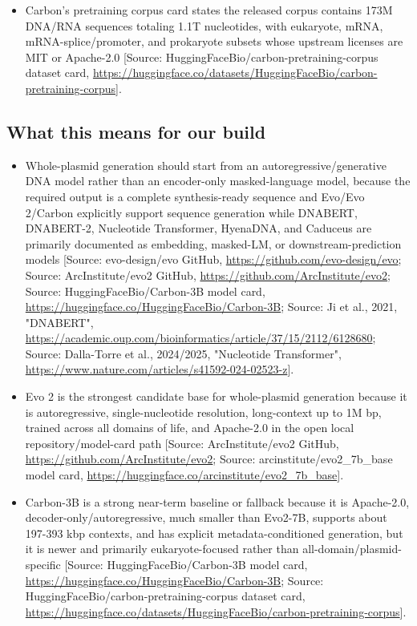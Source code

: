 \documentclass[11pt]{report}
\begin{document}
\begin{itemize}
\item Carbon's pretraining corpus card states the released corpus contains 173M DNA/RNA sequences totaling 1.1T nucleotides, with eukaryote, mRNA, mRNA-splice/promoter, and prokaryote subsets whose upstream licenses are MIT or Apache-2.0 [Source: HuggingFaceBio/carbon-pretraining-corpus dataset card, \url{https://huggingface.co/datasets/HuggingFaceBio/carbon-pretraining-corpus}].
\end{itemize}

\subsection{What this means for our build}
\begin{itemize}
\item Whole-plasmid generation should start from an autoregressive/generative DNA model rather than an encoder-only masked-language model, because the required output is a complete synthesis-ready sequence and Evo/Evo 2/Carbon explicitly support sequence generation while DNABERT, DNABERT-2, Nucleotide Transformer, HyenaDNA, and Caduceus are primarily documented as embedding, masked-LM, or downstream-prediction models [Source: evo-design/evo GitHub, \url{https://github.com/evo-design/evo}; Source: ArcInstitute/evo2 GitHub, \url{https://github.com/ArcInstitute/evo2}; Source: HuggingFaceBio/Carbon-3B model card, \url{https://huggingface.co/HuggingFaceBio/Carbon-3B}; Source: Ji et al., 2021, "DNABERT", \url{https://academic.oup.com/bioinformatics/article/37/15/2112/6128680}; Source: Dalla-Torre et al., 2024/2025, "Nucleotide Transformer", \url{https://www.nature.com/articles/s41592-024-02523-z}].
\item Evo 2 is the strongest candidate base for whole-plasmid generation because it is autoregressive, single-nucleotide resolution, long-context up to 1M bp, trained across all domains of life, and Apache-2.0 in the open local repository/model-card path [Source: ArcInstitute/evo2 GitHub, \url{https://github.com/ArcInstitute/evo2}; Source: arcinstitute/evo2\_7b\_base model card, \url{https://huggingface.co/arcinstitute/evo2_7b_base}].
\item Carbon-3B is a strong near-term baseline or fallback because it is Apache-2.0, decoder-only/autoregressive, much smaller than Evo2-7B, supports about 197-393 kbp contexts, and has explicit metadata-conditioned generation, but it is newer and primarily eukaryote-focused rather than all-domain/plasmid-specific [Source: HuggingFaceBio/Carbon-3B model card, \url{https://huggingface.co/HuggingFaceBio/Carbon-3B}; Source: HuggingFaceBio/carbon-pretraining-corpus dataset card, \url{https://huggingface.co/datasets/HuggingFaceBio/carbon-pretraining-corpus}].

\end{itemize}
\end{document}
